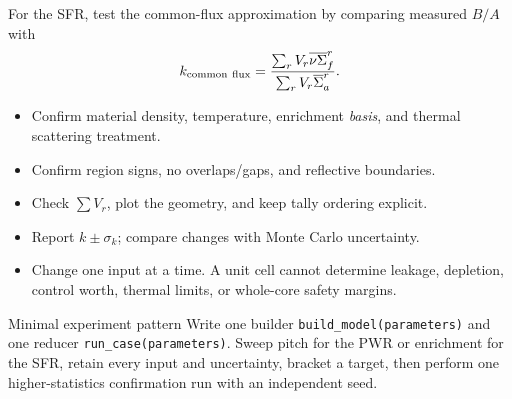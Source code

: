 \documentclass{ne630handout}
\begin{document}
For the SFR, test the common-flux approximation by comparing measured
$B/A$ with
\[
 k_{\rm common\ flux}=
 \frac{\sum_rV_r\overline{\nu\Sigma}_f^r}
      {\sum_rV_r\overline\Sigma_a^r}.
\]

\begin{itemize}\setlength\itemsep{1pt}\setlength\parskip{0pt}\setlength\topsep{2pt}
 \item Confirm material density, temperature, enrichment \emph{basis}, and
       thermal scattering treatment.
 \item Confirm region signs, no overlaps/gaps, and reflective boundaries.
 \item Check $\sum V_r$, plot the geometry, and keep tally ordering explicit.
 \item Report $k\pm\sigma_k$; compare changes with Monte Carlo uncertainty.
 \item Change one input at a time.  A unit cell cannot determine leakage,
       depletion, control worth, thermal limits, or whole-core safety margins.
\end{itemize}

\begin{OpenMCExplore}{Minimal experiment pattern}
Write one builder \texttt{build\_model(parameters)} and one reducer
\texttt{run\_case(parameters)}.  Sweep pitch for the PWR or enrichment for
the SFR, retain every input and uncertainty, bracket a target, then perform
one higher-statistics confirmation run with an independent seed.
\end{OpenMCExplore}
\colend

\end{document}
